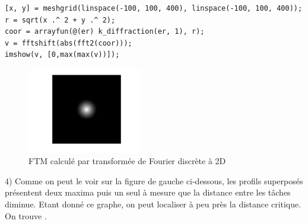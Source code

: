 \documentclass[a4paper, 11pt]{article}
\begin{document}
\begin{lstlisting}[frame=single]
[x, y] = meshgrid(linspace(-100, 100, 400), linspace(-100, 100, 400));
r = sqrt(x .^ 2 + y .^ 2);
coor = arrayfun(@(er) k_diffraction(er, 1), r);
v = fftshift(abs(fft2(coor)));
imshow(v, [0,max(max(v))]);
\end{lstlisting}

\begin{figure}[!h]
\centering
\includegraphics[width=5cm]{ftm_fft2.png}
\caption{FTM calculé par transformée de Fourier discrète à 2D}
\end{figure}


4) Comme on peut le voir sur la figure de gauche ci-dessous, les profils superposés présentent deux maxima puis un seul
à mesure que la distance entre les tâches diminue. Etant donné ce graphe, on peut localiser à peu près la distance
critique. On trouve .

\begin{figure}[!h]
\centering
{}%
\qquad
{}%
\end{figure}
\end{document}
